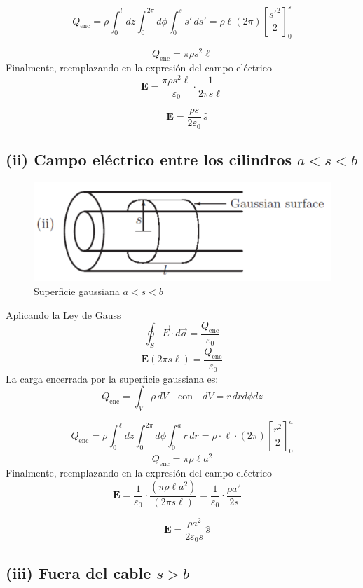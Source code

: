 \documentclass[12pt]{article}
\begin{document}
\[
Q_{\text{enc}} = \rho \int_0^{l} dz \int_0^{2\pi} d\phi \int_0^s s' \, ds'
= \rho \ell (2\pi) \left[ \frac{s'^2}{2} \right]_0^s
\]

\[
Q_{\text{enc}} = \pi \rho s^2 \ell
\]
Finalmente, reemplazando en la expresión del campo eléctrico
\[
\textbf{E}= \frac{\pi \rho s^2 \ell}{ \varepsilon_0} \cdot \frac{1}{2\pi s \ell}
\]

\[
\boxed{\quad 
\textbf{E} =  \frac{\rho s}{2\varepsilon_0} \, \hat{s}
}\]

\subsection*{(ii) Campo eléctrico entre los cilindros \( a < s < b \)}

\begin{figure}[ht]
    \centering
    \includegraphics[width=0.75\linewidth]{imagenes/(ii).png}
    \caption*{Superficie gaussiana \( a < s < b \)}
    \label{fig:enter-label}
\end{figure}

Aplicando la Ley de Gauss
\[
\oint_S \vec{E} \cdot d\vec{a} = \frac{Q_{\text{enc}}}{\varepsilon_0}
\]
\[
\textbf{E} (2\pi s \ell) = \frac{Q_{\text{enc}}}{\varepsilon_0}
\]
La carga encerrada por la superficie gaussiana es:
\[
Q_{\text{enc}} = \int_V \rho \, dV \quad \text{con} \quad dV = r \, dr d\phi dz 
\]

\[
Q_{\text{enc}} = \rho \int_0^{\ell} dz \int_0^{2\pi} d\phi \int_0^a r \, dr 
= \rho \cdot \ell \cdot (2\pi) \left[ \frac{r^2}{2} \right]_0^a 
\]
\[
Q_{\text{enc}} = \pi \rho \ell a^2
\]
Finalmente, reemplazando en la expresión del campo eléctrico
\[
\textbf{E} = \frac{1}{\varepsilon_0} \cdot \frac{(\pi \rho \ell a^2)}{(2\pi s \ell)} 
= \frac{1}{\varepsilon_0} \cdot \frac{\rho a^2}{2s} 
\quad 
\]

\[
\boxed{\quad 
\textbf{E} = \frac{\rho a^2}{2\varepsilon_0 s} \, \hat{s}
}\]

\subsection*{(iii) Fuera del cable \( s > b \)}
\end{document}

